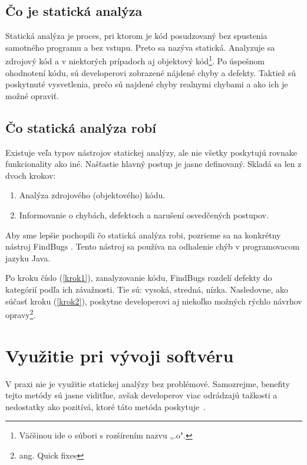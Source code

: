 \documentclass[11pt,twoside,slovak,a4paper]{article}
\begin{document}
\subsection{Čo je statická analýza} \label{principy:co}
Statická analýza je proces, pri ktorom je kód posudzovaný bez spustenia samotného programu a bez vstupu. Preto sa nazýva statická.
Analyzuje sa zdrojový kód a v niektorých prípadoch aj objektový kód\footnote{Väčšinou ide o súbori s rozšírením nazvu „.o".}.
Po úspešnom ohodnotení kódu, sú developerovi zobrazené nájdené chyby a defekty. Taktiež sú poskytnuté vysvetlenia, prečo sú najdené
chyby realnymi chybami a ako ich je možné opraviť.
\cite{wiki:Static_program_analysis}

\subsection{Čo statická analýza robí} \label{principy:ako}
Existuje veľa typov nástrojov statickej analýzy, ale nie všetky poskytujú rovnake funkcionality ako iné. Našťastie hlavný
postup je jasne definovaný. Skladá sa len z dvoch krokov:

\begin{enumerate}
	\item Analýza zdrojového (objektového) kódu. \label{krok1}
	\item Informovanie o chybách, defektoch a narušení osvedčených postupov. \label{krok2}
\end{enumerate}

Aby sme lepšie pochopili čo statická analýza robi, pozrieme sa na konkrétny nástroj FindBugs \cite{FindBugs}. Tento nástroj sa používa na
odhalenie chýb v programovacom jazyku Java.

Po kroku číslo (\ref{krok1}), zanalyzovanie kódu, FindBugs rozdelí defekty do kategórií podľa ich závažnosti. Tie sú: vysoká, stredná, nízka.
Nasledovne, ako súčasť kroku (\ref{krok2}), poskytne developerovi aj niekoľko možných rýchlo návrhov opravy\footnote{ang. Quick fixes}.\cite{BrittanyJohnson}



\section{Využitie pri vývoji softvéru} \label{vyuzitie}
V praxi nie je využitie statickej analýzy bez problémové. Samozrejme, benefity tejto metódy sú jasne viditľne, avšak developerov viac odrádzajú
tažkosti a nedostatky ako pozitívá, ktoré táto metóda poskytuje~\cite{BrittanyJohnson}.
\end{document}
